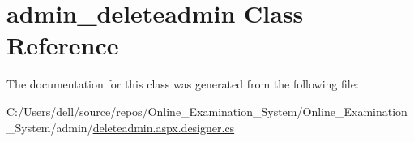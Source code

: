 \hypertarget{classadmin__deleteadmin}{}\section{admin\+\_\+deleteadmin Class Reference}
\label{classadmin__deleteadmin}


The documentation for this class was generated from the following file\+:\begin{DoxyCompactItemize}
\item 
C\+:/\+Users/dell/source/repos/\+Online\+\_\+\+Examination\+\_\+\+System/\+Online\+\_\+\+Examination\+\_\+\+System/admin/\mbox{\hyperlink{deleteadmin_8aspx_8designer_8cs}{deleteadmin.\+aspx.\+designer.\+cs}}\end{DoxyCompactItemize}
